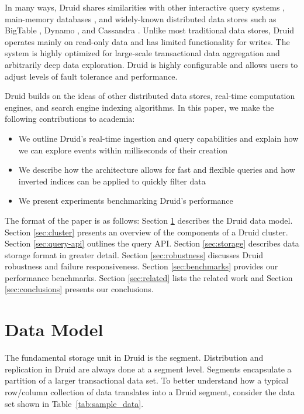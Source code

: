 \documentclass{vldb}
\begin{document}
In many ways, Druid shares similarities with other interactive query systems
\cite{melnik2010dremel}, main-memory databases \cite{farber2012sap}, and widely-known distributed data
stores such as BigTable \cite{chang2008bigtable}, Dynamo \cite{decandia2007dynamo}, and Cassandra \cite{lakshman2010cassandra}. Unlike
most traditional data stores, Druid operates mainly on read-only data
and has limited functionality for writes. The system is highly optimized
for large-scale transactional data aggregation and arbitrarily deep data exploration. Druid is highly configurable
and allows users to adjust levels of fault tolerance and
performance.

Druid builds on the ideas of other distributed data stores, real-time
computation engines, and search engine indexing algorithms. In this
paper, we make the following contributions to academia:
\begin{itemize}
\item We outline Druid’s real-time ingestion and query capabilities
  and explain how we can explore events within milliseconds of their
  creation
\item We describe how the architecture allows for fast and flexible
  queries and how inverted indices can be applied to quickly filter
  data
\item We present experiments benchmarking Druid’s performance
\end{itemize}
The format of the paper is as follows: Section \ref{sec:data-model} describes the Druid
data model. Section \ref{sec:cluster} presents an overview of the components of a
Druid cluster. Section \ref{sec:query-api} outlines the query API. Section \ref{sec:storage} describes
data storage format in greater detail. Section \ref{sec:robustness} discusses Druid
robustness and failure responsiveness. Section \ref{sec:benchmarks} provides our
performance benchmarks. Section \ref{sec:related} lists the related work and Section \ref{sec:conclusions} presents
our conclusions.

\section{Data Model}
\label{sec:data-model}
The fundamental storage unit in Druid is the segment. Distribution and
replication in Druid are always done at a segment level. Segments
encapsulate a partition of a larger transactional data set. To better
understand how a typical row/column collection of data translates into
a Druid segment, consider the data set shown in Table~\ref{tab:sample_data}.
\end{document}
